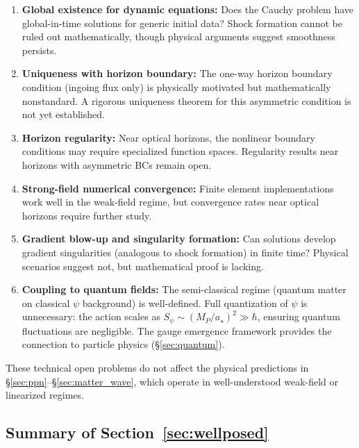 \begin{enumerate}
\item \textbf{Global existence for dynamic equations:} Does the Cauchy 
problem have global-in-time solutions for generic initial data? Shock 
formation cannot be ruled out mathematically, though physical arguments 
suggest smoothness persists.

\item \textbf{Uniqueness with horizon boundary:} The one-way horizon 
boundary condition (ingoing flux only) is physically motivated but 
mathematically nonstandard. A rigorous uniqueness theorem for this 
asymmetric condition is not yet established.

\item \textbf{Horizon regularity:} Near optical horizons, the nonlinear 
boundary conditions may require specialized function spaces. Regularity 
results near horizons with asymmetric BCs remain open.

\item \textbf{Strong-field numerical convergence:} Finite element 
implementations work well in the weak-field regime, but convergence 
rates near optical horizons require further study.

\item \textbf{Gradient blow-up and singularity formation:} Can solutions 
develop gradient singularities (analogous to shock formation) in finite 
time? Physical scenarios suggest not, but mathematical proof is lacking.

\item \textbf{Coupling to quantum fields:} The semi-classical regime 
(quantum matter on classical $\psi$ background) is well-defined. Full 
quantization of $\psi$ is unnecessary: the action scales as $S_\psi \sim (M_P/a_\star)^2 \gg \hbar$, 
ensuring quantum fluctuations are negligible. The gauge emergence framework 
provides the connection to particle physics (\S\ref{sec:quantum}).
\end{enumerate}

These technical open problems do not affect the physical predictions in 
\S\ref{sec:ppn}--\S\ref{sec:matter_wave}, which operate in well-understood 
weak-field or linearized regimes.

\subsection{Summary of Section~\ref{sec:wellposed}}

